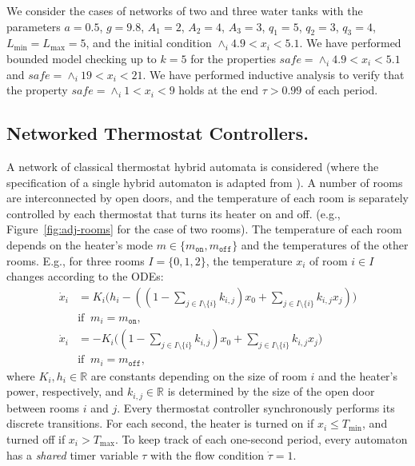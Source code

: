 We consider the cases of networks of two and three water tanks
with the parameters
$a = 0.5$,
$g = 9.8$,
$A_1 = 2$, 
$A_2 = 4$, 
$A_3 = 3$, 
$q_1 = 5$,
$q_2 = 3$,
$q_3 = 4$,
$L_{\min} = L_{\max} = 5$,
and the initial condition $\wedge_{i} 4.9 < x_i < 5.1$.
We have performed bounded model checking up to $k = 5$
for the properties $\mathit{safe} = \wedge_{i} 4.9 < x_i < 5.1$ 
and $\mathit{safe} = \wedge_{i} 19 < x_i < 21$.
We have performed 
inductive analysis 
to verify that the property $\mathit{safe} = \wedge_{i} 1 < x_i < 9$
holds at the end $\tau > 0.99$ of each period.





\subsection{Networked Thermostat Controllers.}

A network of classical thermostat hybrid automata is considered 
(where the specification of a single hybrid automaton is adapted from \cite{henzinger2000theory}). 
A number of rooms are interconnected by open doors,
and the temperature of each room is separately controlled by each thermostat
that turns its heater on and off.
(e.g., Figure~\ref{fig:adj-rooms}  for the case of two rooms).
The temperature of each room depends on
the heater's mode $m \in \{m_\texttt{on}, m_\texttt{off}\}$  and the temperatures of the other rooms.
E.g., for three rooms $I = \{0,1,2\}$, 
the temperature $x_i$ of room $i \in I$
changes according to the ODEs:
\[
\begin{aligned}
\dot{x}_i &= K_i \big(h_i - ((1- \textstyle\sum_{j \in I \setminus \{i\}} k_{i,j}) x_0 + \sum_{j \in I \setminus \{i\}} k_{i,j}  x_j)\big)
\\ 
&\mbox{if}\;\; m_i = m_\texttt{on},
\\
\dot{x}_i &= - K_i \big((1- \textstyle\sum_{j \in I \setminus \{i\}} k_{i,j}) x_0 + \sum_{j \in I \setminus \{i\}} k_{i,j}  x_j\big)
\\
& \mbox{if}\;\; m_i = m_\texttt{off},
\end{aligned}
\]
where $K_i, h_i \in \mathbb{R}$ are constants depending on
the size of room $i$ and the heater's power, respectively,
and $k_{i,j} \in \mathbb{R}$ is determined by the size of the open door between rooms $i$ and $j$.
%
Every thermostat controller synchronously performs its discrete transitions.
For each second, 
the heater is turned on if $x_i \leq T_{\min}$,
and turned off if $x_i > T_{\max}$.
To keep track of each one-second period,
every automaton has a \emph{shared} timer variable $\tau$ 
with the flow condition $\dot{\tau} = 1$.

